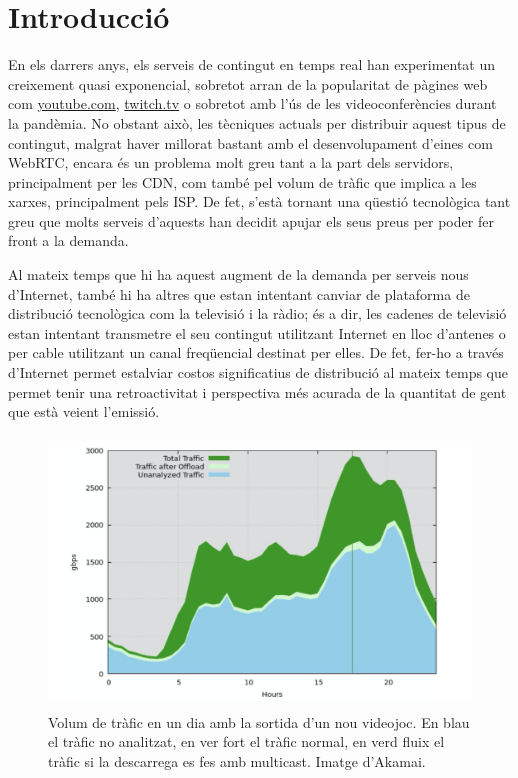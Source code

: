 \section{Introducció}
{
    En els darrers anys, els serveis de contingut en temps real han experimentat un creixement quasi exponencial, sobretot arran de la
    popularitat de pàgines web com \url{youtube.com}, \url{twitch.tv} o sobretot amb l'ús de les videoconferències durant la pandèmia.
    No obstant això, les tècniques actuals per distribuir aquest tipus de contingut, malgrat haver millorat bastant amb el desenvolupament
    d'eines com \ac{WebRTC}, encara és un problema molt greu tant a la part dels servidors, principalment per les \ac{CDN}, com també pel
    volum de tràfic que implica a les xarxes, principalment pels \ac{ISP}. De fet, s'està tornant una qüestió tecnològica tant greu que molts
    serveis d'aquests han decidit apujar els seus preus per poder fer front a la demanda.

    Al mateix temps que hi ha aquest augment de la demanda per serveis nous d'Internet, també hi ha altres que estan intentant canviar
    de plataforma de distribució tecnològica com la televisió i la ràdio; és a dir, les cadenes de televisió estan intentant transmetre el seu contingut utilitzant Internet en lloc d'antenes o per cable utilitzant un canal freqüencial destinat per elles. De fet, fer-ho a través
    d'Internet permet estalviar costos significatius de distribució al mateix temps que permet tenir una retroactivitat i perspectiva més acurada
    de la quantitat de gent que està veient l'emissió.

    \begin{figure}[H]
        \label{fig:trafic_desglosat}
        \centering
        \includegraphics[width=15cm, height=7.2cm]{img/01_introduccio/trafic_peak.png}
        \caption[Trafic d'Internet]{\footnotesize{Volum de tràfic en un dia amb la sortida d'un nou videojoc. En blau el tràfic no analitzat,
        en ver fort el tràfic normal, en verd fluix el tràfic si la descarrega es fes amb multicast. Imatge d'Akamai.}}
    \end{figure}

}
